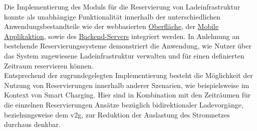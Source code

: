 Die Implementierung des Moduls für die Reservierung von Ladeinfrastruktur konnte als unabhängige Funktionalität innerhalb der unterschiedlichen Anwendungsbestandteile wie der webbasierten \href{https://github.com/JulianHBuecher/ev-dashboard}{Oberfläche}, der \href{https://github.com/JulianHBuecher/ev-mobile}{Mobile Applikaktion}, sowie des \href{https://github.com/JulianHBuecher/ev-server}{Backend-Servers} integriert werden.
In Anlehnung an bestehende Reservierungssysteme demonstriert die Anwendung, wie Nutzer \"uber das System zugewiesene Ladeinfrastruktur verwalten und f\"ur einen definierten Zeitraum reservieren k\"onnen.\\
Entsprechend der zugrundegelegten Implementierung besteht die M\"oglichkeit der Nutzung von Reservierungen innerhalb anderer Szenarien, wie beispielsweise im Kontext von Smart Charging. Hier sind in Kombination mit den Zeitr\"aumen für die einzelnen Reservierungen Ans\"atze bez\"uglich bidirektionaler Ladevorg\"ange, beziehungsweise dem \acrfull{v2g}, zur Reduktion der Auslastung des Stromnetzes durchaus denkbar.